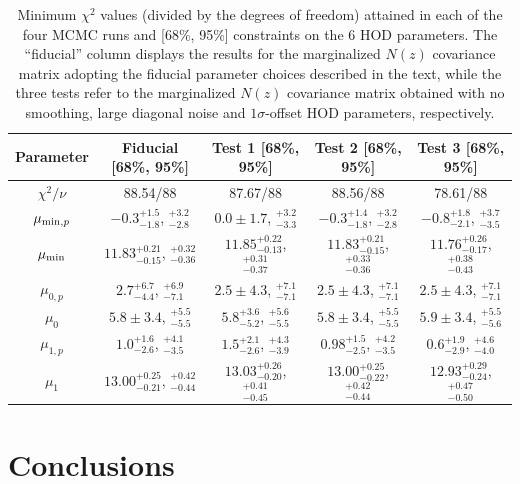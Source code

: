 \documentclass[a4paper,11pt]{article}
\begin{document}
\begin{table}
\begin{center}
\begin{tabular}{c | c c c c} 
 \hline\hline
 Parameter & Fiducial [68\%, 95\%] & Test 1 [68\%, 95\%] & Test 2 [68\%, 95\%] & Test 3 [68\%, 95\%] \\ [0.5ex] 
 \hline
 $\chi^2/\nu$ & 88.54/88 & 87.67/88 & 88.56/88 & 78.61/88 \\ 
$\mu_{{\rm min},p}$ & $-0.3^{+1.5}_{-1.8}$, $^{+3.2}_{-2.8}$ & $0.0\pm 1.7$, $^{+3.2}_{-3.3}$ & $-0.3^{+1.4}_{-1.8}$, $^{+3.2}_{-2.8}$ & $-0.8^{+1.8}_{-2.1}$, $^{+3.7}_{-3.5}$ \\ [1ex]
$\mu_{\rm min}$ & $11.83^{+0.21}_{-0.15}$, $^{+0.32}_{-0.36}$ & $11.85^{+0.22}_{-0.13}$, $^{+0.31}_{-0.37}$ & $11.83^{+0.21}_{-0.15}$, $^{+0.33}_{-0.36}$ & $11.76^{+0.26}_{-0.17}$, $^{+0.38}_{-0.43}$ \\ [1ex]
$\mu_{0,p}$ & $2.7^{+6.7}_{-4.4}$, $^{+6.9}_{-7.1}$ & $2.5\pm 4.3$, $^{+7.1}_{-7.1}$ & $2.5\pm 4.3$, $^{+7.1}_{-7.1}$ & $2.5\pm 4.3$, $^{+7.1}_{-7.1}$ \\ [1ex]
$\mu_{0}$ & $5.8\pm 3.4$, $^{+5.5}_{-5.5}$ & $5.8^{+3.6}_{-5.2}$, $^{+5.6}_{-5.5}$ & $5.8\pm 3.4$, $^{+5.5}_{-5.5}$ & $5.9\pm 3.4$, $^{+5.5}_{-5.6}$ \\ [1ex]
$\mu_{1,p}$ & $1.0^{+1.6}_{-2.6}$, $^{+4.1}_{-3.5}$ & $1.5^{+2.1}_{-2.6}$, $^{+4.3}_{-3.9}$ & $0.98^{+1.5}_{-2.5}$, $^{+4.2}_{-3.5}$ & $0.6^{+1.9}_{-2.9}$, $^{+4.6}_{-4.0}$ \\ [1ex]
$\mu_{1}$ & $13.00^{+0.25}_{-0.21}$, $^{+0.42}_{-0.44}$ & $13.03^{+0.26}_{-0.20}$, $^{+0.41}_{-0.45}$ & $13.00^{+0.25}_{-0.22}$, $^{+0.42}_{-0.44}$ & $12.93^{+0.29}_{-0.24}$, $^{+0.47}_{-0.50}$ \\ [1ex]
 \hline
 \hline
\end{tabular}
\end{center}
\caption{Minimum $\chi^2$ values (divided by the degrees
of freedom) attained in each of the four MCMC runs
and [68\%, 95\%] constraints on the 6 HOD parameters. The
``fiducial'' column displays the results for the marginalized
$N(z)$ covariance matrix adopting the fiducial parameter
choices described in the text, while the three tests
refer to the marginalized $N(z)$ covariance matrix
obtained with no smoothing, large diagonal noise and
$1\sigma$-offset HOD parameters, respectively.}
\label{tab:chi2_tests}
\end{table}



\section{Conclusions}
\end{document}
